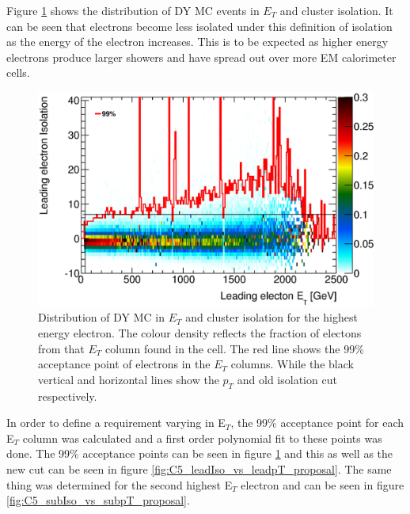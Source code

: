 Figure \ref{fig:C5_leadIso_vs_leadpT} shows the distribution of DY MC events in $E_{T}$ and cluster isolation. It can be seen that electrons become less isolated under this definition of isolation as the energy of the electron increases. This is to be expected as higher energy electrons produce larger showers and have spread out over more EM calorimeter cells. 

   \begin{figure}[h!]
      \begin{center}
      \includegraphics[scale=0.7]{images/C5_leadIso_vs_leadpT.eps}
      \end{center}
   \caption{Distribution of DY MC in $E_{T}$ and cluster isolation for the highest energy electron. The colour density reflects the fraction of electons from that $E_{T}$ column found in the cell. The red line shows the 99\% acceptance point of electrons in the $E_{T}$ columns. While the black vertical and horizontal lines show the $p_{T}$ and old isolation cut respectively.}
   \label{fig:C5_leadIso_vs_leadpT}
   \end{figure}


In order to define a requirement varying in E$_{T}$, the 99\% acceptance point for each E$_{T}$ column was calculated and a first order polynomial fit to these points was done. The 99\% acceptance points can be seen in figure \ref{fig:C5_leadIso_vs_leadpT} and this as well as the new cut can be seen in figure \ref{fig:C5_leadIso_vs_leadpT_proposal}. The same thing was determined for the second highest E$_{T}$ electron and can be seen in figure \ref{fig:C5_subIso_vs_subpT_proposal}.


